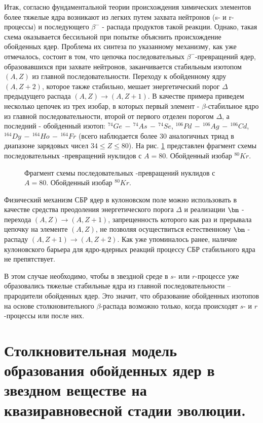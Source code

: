 Итак, согласно фундаментальной теории происхождения химических элементов
более тяжелые ядра возникают
из легких путем захвата нейтронов (s- и r-процессы) и последующего
$\beta^-$ - распада продуктов такой реакции. Однако, такая схема оказывается
бессильной при попытке объяснить происхождение обойденных ядер. Проблема
их синтеза по указанному механизму, как уже отмечалось, состоит в том, что цепочка последовательных
$\beta^-$-превращений ядер, образовавшихся при захвате нейтронов, заканчивается
стабильным изотопом $(A,Z)$ из главной последовательности.
Переходу к обойденному ядру $(A,Z+2)$, которое также стабильно, мешает энергетический
порог $\Delta$ предыдущего распада $(A,Z)\rightarrow (A,Z+1)$.
В качестве примера приведем несколько цепочек из трех изобар, в которых
первый элемент - $\beta$-стабильное ядро из главной последовательности,
второй от первого отделен порогом $\Delta$, а последний - обойденный изотоп:
$^{74}Ge\,-\,{}^{74}As\,-\,{}^{74}Se$, ${}^{106}Pd\,-\,{}^{106}Ag\,-\,{}^{106}Cd$,
${}^{164}Dy\,-\,{}^{164}Ho\,-\,{}^{164}Fr$ (всего наблюдается более 30 аналогичных
триад в диапазоне зарядовых чисел $34\leq Z\leq 80$).
На рис. \ref{FR} представлен фрагмент схемы последовательных \be-превращений
нуклидов с $A=80$. Обойденный изобар $^{80}Kr$.

\begin{figure}
\vspace{18 true cm}
\caption{{Фрагмент схемы последовательных \be-превращений
нуклидов с $A=80$. Обойденный изобар $^{80}Kr$.}}
\label{FR}
\end{figure}

Физический механизм СБР ядер в кулоновском поле можно использовать в качестве
средства преодоления энергетического порога $\Delta$ и реализации
$\bm$ - перехода $(A,Z)\rightarrow (A,Z+1)$, запрещенность которого
как раз и прерывала цепочку на элементе $(A,Z)$, не позволяя осуществиться
естественному $\bm$ - распаду $(A,Z+1)\rightarrow (A,Z+2)$. Как уже упоминалось
ранее, наличие кулоновского барьера для ядро-ядерных реакций процессу СБР стабильного
ядра не препятствует.

В этом случае необходимо, чтобы в звездной среде в $s$- или $r$-процессе
уже образовались тяжелые стабильные ядра из главной последовательности --
прародители обойденных ядер. Это значит, что образование обойденных изотопов
на основе столкновительного $\beta$-распада возможно только, когда
происходят $s$- и $r$-процессы или после них.

\section{Столкновительная модель образования  обойденных  ядер
в звездном веществе на квазиравновесной стадии эволюции.}


